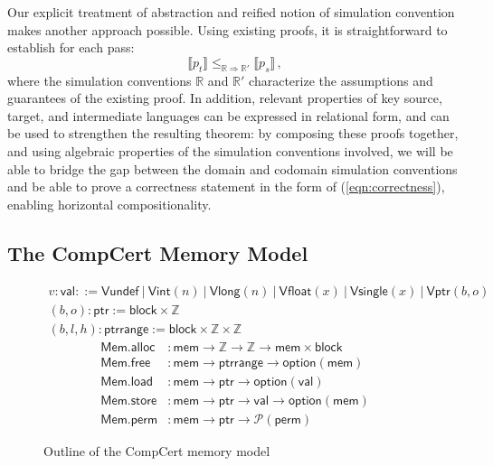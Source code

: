\documentclass[acmsmall,timestamp,review,anonymous]{acmart}
\newcommand{\kw}[1]{\ensuremath{ \mathsf{#1} }}
\newcommand{\alt}{\ |\ } %
\begin{document}
Our explicit treatment of abstraction
and reified notion of simulation convention
makes another approach possible.
Using existing proofs, it is straightforward
to establish
for each pass:
\begin{equation}
    \label{correctness-alt}
    \llbracket p_t \rrbracket
    \le_{\mathbb{R} \Rightarrow \mathbb{R}'}
    \llbracket p_s \rrbracket \,,
\end{equation}
where the simulation conventions $\mathbb{R}$ and $\mathbb{R}'$
characterize the assumptions and guarantees
of the existing proof.
In addition,
relevant properties of key source, target, and intermediate languages
can be expressed in relational form,
and can be used to strengthen the resulting theorem:
by composing these proofs together,
and using algebraic properties of
the simulation conventions involved,
we will be able to bridge the gap
between the domain and codomain simulation conventions
and be able to prove a correctness statement
in the form of (\ref{eqn:correctness}),
enabling horizontal compositionality.


\subsection{The CompCert Memory Model} \label{sec:compcert:mm} %

\begin{figure} %
  \footnotesize
  \begin{gather*}
    v : \kw{val} ::=
      \kw{Vundef} \alt
      \kw{Vint}(n) \alt
      \kw{Vlong}(n) \alt
      \kw{Vfloat}(x) \alt
      \kw{Vsingle}(x) \alt
      \kw{Vptr}(b, o)
    \\
    (b, o) : \kw{ptr} :=
      \kw{block} \times \mathbb{Z}
    \\
    (b, l, h) : \kw{ptrrange} :=
      \kw{block} \times \mathbb{Z} \times \mathbb{Z}
  \end{gather*}
  \begin{align*}
    \kw{Mem.alloc} &:
      \kw{mem} \rightarrow \mathbb{Z} \rightarrow \mathbb{Z} \rightarrow
      \kw{mem} \times \kw{block}
    \\
    \kw{Mem.free} &:
      \kw{mem} \rightarrow
      \kw{ptrrange} \rightarrow
      \kw{option}(\kw{mem})
    \\
    \kw{Mem.load} &:
      \kw{mem} \rightarrow \kw{ptr} \rightarrow \kw{option}(\kw{val})
    \\
    \kw{Mem.store} &:
      \kw{mem} \rightarrow \kw{ptr} \rightarrow \kw{val} \rightarrow \kw{option}(\kw{mem})
    \\
    \kw{Mem.perm} &:
      \kw{mem} \rightarrow \kw{ptr} \rightarrow \mathcal{P}(\kw{perm})
  \end{align*}
  \caption{Outline of the CompCert memory model}
  \label{fig:mm}
\end{figure}
\end{document}
